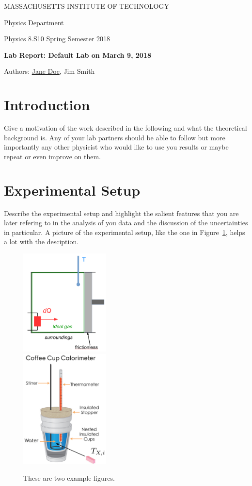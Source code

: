 \documentclass[12pt]{article}
\begin{document}
\centerline{MASSACHUSETTS INSTITUTE OF TECHNOLOGY}
\centerline{Physics Department}
\noindent Physics 8.S10 \hfil Spring Semester 2018\break


\centerline{\bf Lab Report: Default Lab on March 9, 2018} %
\centerline{Authors: \underline{Jane Doe}, Jim Smith}     %

\section{Introduction}

Give a motivation of the work described in the following and what the
theoretical background is. Any of your lab partners should be able to follow but
more importantly any other physicist who would like to use you results or maybe
repeat or even improve on them.

\section{Experimental Setup}

Describe the experimental setup and highlight the salient features that you are
later refering to in the analysis of you data and the discussion of the
uncertainties in particular. A picture of the experimental setup, like the one
in Figure~\ref{fig:myPngExample}, helps a lot with the desciption.

\begin{figure}[htbp!]
  \centering
  \includegraphics[width=0.4\textwidth]{myPngExample1.png}~~~~~~~~~~~~~
  \includegraphics[width=0.4\textwidth]{myPngExample2.png}
  \caption{\label{fig:myPngExample}
    These are two example figures.
  }
\end{figure}
\end{document}

